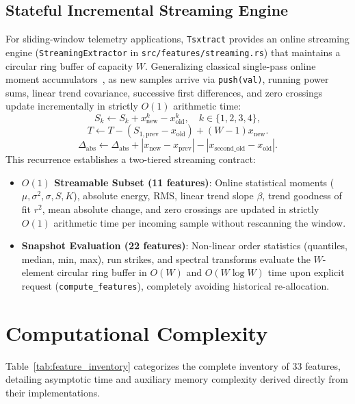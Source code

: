 \documentclass[conference]{IEEEtran}
\newcommand{\tsxtract}{\texttt{Tsxtract}}
\begin{document}
\subsection{Stateful Incremental Streaming Engine}
For sliding-window telemetry applications, \tsxtract{} provides an online streaming engine (\texttt{StreamingExtractor} in \texttt{src/features/}\allowbreak\texttt{streaming.rs}) that maintains a circular ring buffer of capacity $W$. Generalizing classical single-pass online moment accumulators~\cite{welford1962note}, as new samples arrive via \texttt{push(val)}, running power sums, linear trend covariance, successive first differences, and zero crossings update incrementally in strictly $O(1)$ arithmetic time:
\begin{equation}
\label{eq:stream_power_sum}
S_k \leftarrow S_k + x_{\text{new}}^k - x_{\text{old}}^k, \quad k \in \{1, 2, 3, 4\},
\end{equation}
\begin{equation}
\label{eq:stream_trend}
T \leftarrow T - (S_{1, \text{prev}} - x_{\text{old}}) + (W - 1) x_{\text{new}}.
\end{equation}
\begin{equation}
\label{eq:stream_diff}
\Delta_{\text{abs}} \leftarrow \Delta_{\text{abs}} + |x_{\text{new}} - x_{\text{prev}}| - |x_{\text{second\_old}} - x_{\text{old}}|.
\end{equation}
This recurrence establishes a two-tiered streaming contract:
\begin{itemize}
    \item \textbf{$O(1)$ Streamable Subset (11 features)}: Online statistical moments ($\mu, \sigma^2, \sigma, S, K$), absolute energy, RMS, linear trend slope $\beta$, trend goodness of fit $r^2$, mean absolute change, and zero crossings are updated in strictly $O(1)$ arithmetic time per incoming sample without rescanning the window.
    \item \textbf{Snapshot Evaluation (22 features)}: Non-linear order statistics (quantiles, median, min, max), run strikes, and spectral transforms evaluate the $W$-element circular ring buffer in $O(W)$ and $O(W \log W)$ time upon explicit request (\texttt{compute\_features}), completely avoiding historical re-allocation.
\end{itemize}

\section{Computational Complexity}
\label{sec:complexity}
Table~\ref{tab:feature_inventory} categorizes the complete inventory of 33 features, detailing asymptotic time and auxiliary memory complexity derived directly from their implementations.
\end{document}
